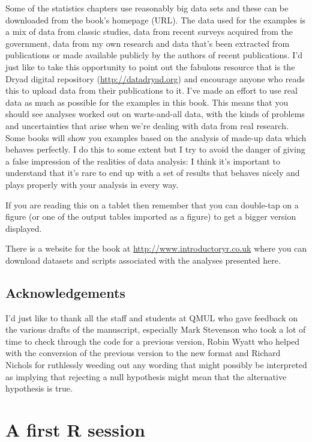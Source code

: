 \documentclass[
]{book}
\begin{document}
Some of the statistics chapters use reasonably big data sets and these can be downloaded from the book's homepage (URL). The data used for the examples is a mix of data from classic studies, data from recent surveys acquired from the government, data from my own research and data that's been extracted from publications or made available publicly by the authors of recent publications. I'd just like to take this opportunity to point out the fabulous resource that is the Dryad digital repository (\url{http://datadryad.org}) and encourage anyone who reads this to upload data from their publications to it. I've made an effort to use real data as much as possible for the examples in this book. This means that you should see analyses worked out on warts-and-all data, with the kinds of problems and uncertainties that arise when we're dealing with data from real research. Some books will show you examples based on the analysis of made-up data which behaves perfectly. I do this to some extent but I try to avoid the danger of giving a false impression of the realities of data analysis: I think it's important to understand that it's rare to end up with a set of results that behaves nicely and plays properly with your analysis in every way.

If you are reading this on a tablet then remember that you can double-tap on a figure (or one of the output tables imported as a figure) to get a bigger version displayed.

There is a website for the book at \url{http://www.introductoryr.co.uk} where you can download datasets and scripts associated with the analyses presented here.

\hypertarget{acknowledgements}{%
\section{Acknowledgements}\label{acknowledgements}}

I'd just like to thank all the staff and students at QMUL who gave feedback on the various drafts of the manuscript, especially Mark Stevenson who took a lot of time to check through the code for a previous version, Robin Wyatt who helped with the conversion of the previous version to the new format and Richard Nichols for ruthlessly weeding out any wording that might possibly be interpreted as implying that rejecting a null hypothesis might mean that the alternative hypothesis is true.

\hypertarget{a-first-r-session}{%
\chapter{A first R session}\label{a-first-r-session}}
\end{document}
